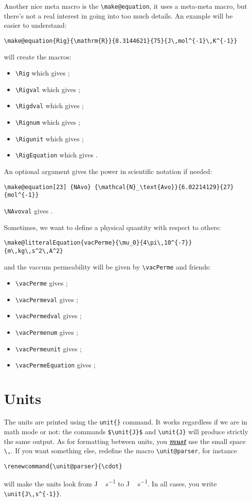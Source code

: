 \documentclass{documentation}
\begin{document}
Another nice meta macro is the \verb!\make@equation!, it uses a meta-meta macro,
but there's not a real interest in going into too much details. An example
will be easier to understand:
\begin{verbatim}
\make@equation{Rig}{\mathrm{R}}{8.3144621}{75}{J\,mol^{-1}\,K^{-1}}
\end{verbatim}
will create the macros:
\begin{itemize}
\item \verb!\Rig!     which gives \Rig;
\item \verb!\Rigval!  which gives \Rigval;
\item \verb!\Rigdval! which gives \Rigdval;
\item \verb!\Rignum!  which gives \Rignum;
\item \verb!\Rigunit! which gives \Rigunit;
\item \verb!\RigEquation! which gives \RigEquation.
\end{itemize}
An optional argument gives the power in scientific notation if needed:
\begin{verbatim}
\make@equation[23] {NAvo} {\mathcal{N}_\text{Avo}}{6.02214129}{27}{mol^{-1}}
\end{verbatim}
\verb!\NAvoval! gives \NAvoval.

Sometimes, we want to define a physical quantity with respect to others:
\begin{verbatim}
\make@litteralEquation{vacPerme}{\mu_0}{4\pi\,10^{-7}}{m\,kg\,s^2\,A^2}
\end{verbatim}
and the vaccum permeability will be given by \verb!\vacPerme! and friends:
\begin{itemize}
\item \verb!\vacPerme!         gives \vacPerme;
\item \verb!\vacPermeval!      gives \vacPermeval;
\item \verb!\vacPermedval!     gives \vacPermedval;
\item \verb!\vacPermenum!      gives \vacPermenum;
\item \verb!\vacPermeunit!     gives \vacPermeunit;
\item \verb!\vacPermeEquation! gives \vacPermeEquation;
\end{itemize}

\section{Units}

The units are printed using the \verb!unit{}! command. It
works regardless if we are in math mode or not: the
commands \verb!$\unit{J}$! and \verb!\unit{J}! will produce
strictly the same output. As for formatting between units,
you \emph{\underline{\textbf{must}}} use  the small space \verb!\,!. If you want something
else, redefine the macro \verb!\unit@parser!, for instance
\begin{verbatim}
\renewcommand{\unit@parser}{\cdot}
\end{verbatim}
will make the units look from \unit{J\,s^{-1}} to
{\makeatletter
\renewcommand{\unit@parser}{\cdot}
\makeatother
\unit{J\,s^{-1}}}. In all cases, you write \verb!\unit{J\,s^{-1}}!.
\end{document}
